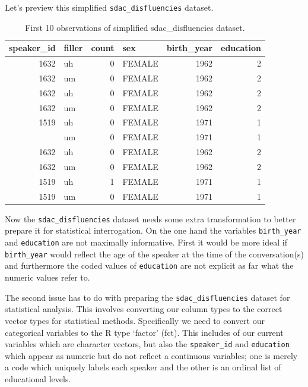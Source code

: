 \documentclass[
  letterpaper,
]{scrbook}
\begin{document}
Let's preview this simplified \texttt{sdac\_disfluencies} dataset.

\hypertarget{tbl-i-sdac-disfluencies-preview}{}
\begin{table}
\caption{\label{tbl-i-sdac-disfluencies-preview}First 10 observations of simplified sdac\_disfluencies dataset. }\tabularnewline

\centering
\begin{tabular}{rlrlrr}
\toprule
speaker\_id & filler & count & sex & birth\_year & education\\
\midrule
1632 & uh & 0 & FEMALE & 1962 & 2\\
1632 & um & 0 & FEMALE & 1962 & 2\\
1632 & uh & 0 & FEMALE & 1962 & 2\\
1632 & um & 0 & FEMALE & 1962 & 2\\
1519 & uh & 0 & FEMALE & 1971 & 1\\
\addlinespace
1519 & um & 0 & FEMALE & 1971 & 1\\
1632 & uh & 0 & FEMALE & 1962 & 2\\
1632 & um & 0 & FEMALE & 1962 & 2\\
1519 & uh & 1 & FEMALE & 1971 & 1\\
1519 & um & 0 & FEMALE & 1971 & 1\\
\bottomrule
\end{tabular}
\end{table}

Now the \texttt{sdac\_disfluencies} dataset needs some extra
transformation to better prepare it for statistical interrogation. On
the one hand the variables \texttt{birth\_year} and \texttt{education}
are not maximally informative. First it would be more ideal if
\texttt{birth\_year} would reflect the age of the speaker at the time of
the conversation(s) and furthermore the coded values of
\texttt{education} are not explicit as far what the numeric values refer
to.

The second issue has to do with preparing the
\texttt{sdac\_disfluencies} dataset for statistical analysis. This
involves converting our column types to the correct vector types for
statistical methods. Specifically we need to convert our categorical
variables to the R type `factor' (fct). This includes of our current
variables which are character vectors, but also the \texttt{speaker\_id}
and \texttt{education} which appear as numeric but do not reflect a
continuous variables; one is merely a code which uniquely labels each
speaker and the other is an ordinal list of educational levels.
\end{document}
